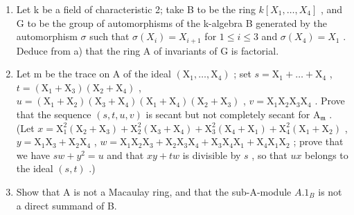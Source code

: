 \begin{enumerate}
\def\labelenumi{\alph{enumi})}
\setcounter{enumi}{1}
\item
  Let k be a field of characteristic 2; take B to be the ring \(k[X_{1},\ldots,X_{4}]\) , and G to be the group of automorphisms of the k-algebra B generated by the automorphism \(\sigma\) such that \(\sigma(X_{i})=X_{i+1}\) for \(1\leqslant i\leqslant3\) and \(\sigma(X_{4})=X_{1}\) . Deduce from a) that the ring A of invariants of G is factorial.
\item
  Let m be the trace on \(\mathrm{A}\) of the ideal \((\mathrm{X}_1, \ldots, \mathrm{X}_4)\) ; set \(s = \mathrm{X}_1 + \ldots + \mathrm{X}_4\) , \(t = (\mathrm{X}_1 + \mathrm{X}_3)(\mathrm{X}_2 + \mathrm{X}_4)\) , \(u = (\mathrm{X}_1 + \mathrm{X}_2)(\mathrm{X}_3 + \mathrm{X}_4)(\mathrm{X}_1 + \mathrm{X}_4)(\mathrm{X}_2 + \mathrm{X}_3)\) , \(v = \mathrm{X}_1\mathrm{X}_2\mathrm{X}_3\mathrm{X}_4\) . Prove that the sequence \((s, t, u, v)\) is secant but not completely secant for \(\mathrm{A}_{\mathfrak{m}}\) . (Let \(x = \mathrm{X}_1^2(\mathrm{X}_2 + \mathrm{X}_3) + \mathrm{X}_2^2(\mathrm{X}_3 + \mathrm{X}_4) + \mathrm{X}_3^2(\mathrm{X}_4 + \mathrm{X}_1) + \mathrm{X}_4^2(\mathrm{X}_1 + \mathrm{X}_2)\) , \(y = \mathrm{X}_1\mathrm{X}_3 + \mathrm{X}_2\mathrm{X}_4\) , \(w = \mathrm{X}_1\mathrm{X}_2\mathrm{X}_3 + \mathrm{X}_2\mathrm{X}_3\mathrm{X}_4 + \mathrm{X}_3\mathrm{X}_4\mathrm{X}_1 + \mathrm{X}_4\mathrm{X}_1\mathrm{X}_2\) ; prove that we have \(sw + y^2 = u\) and that \(xy + tw\) is divisible by \(s\) , so that \(ux\) belongs to the ideal \((s, t)\) .)
\item
  Show that A is not a Macaulay ring, and that the sub-A-module \(A.1_{B}\) is not a direct summand of B.
\end{enumerate}

